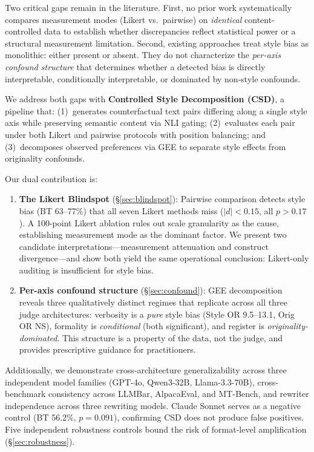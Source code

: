 \documentclass[11pt,twocolumn]{article}
\begin{document}
Two critical gaps remain in the literature. First, no prior work systematically compares measurement modes (Likert vs.\ pairwise) on \emph{identical} content-controlled data to establish whether discrepancies reflect statistical power or a structural measurement limitation. Second, existing approaches treat style bias as monolithic: either present or absent. They do not characterize the \emph{per-axis confound structure} that determines whether a detected bias is directly interpretable, conditionally interpretable, or dominated by non-style confounds.

We address both gaps with \textbf{Controlled Style Decomposition (CSD)}, a pipeline that: (1)~generates counterfactual text pairs differing along a single style axis while preserving semantic content via NLI gating; (2)~evaluates each pair under both Likert and pairwise protocols with position balancing; and (3)~decomposes observed preferences via GEE to separate style effects from originality confounds.

Our dual contribution is:

\begin{enumerate}
\item \textbf{The Likert Blindspot} (\S\ref{sec:blindspot}): Pairwise comparison detects style bias (BT 63--77\%) that all seven Likert methods miss ($|d| < 0.15$, all $p > 0.17$). A 100-point Likert ablation rules out scale granularity as the cause, establishing measurement mode as the dominant factor. We present two candidate interpretations---measurement attenuation and construct divergence---and show both yield the same operational conclusion: Likert-only auditing is insufficient for style bias.

\item \textbf{Per-axis confound structure} (\S\ref{sec:confound}): GEE decomposition reveals three qualitatively distinct regimes that replicate across all three judge architectures: verbosity is a \emph{pure} style bias (Style OR 9.5--13.1, Orig OR NS), formality is \emph{conditional} (both significant), and register is \emph{originality-dominated}. This structure is a property of the data, not the judge, and provides prescriptive guidance for practitioners.
\end{enumerate}

Additionally, we demonstrate cross-architecture generalizability across three independent model families (GPT-4o, Qwen3-32B, Llama-3.3-70B), cross-benchmark consistency across LLMBar, AlpacaEval, and MT-Bench, and rewriter independence across three rewriting models. Claude Sonnet serves as a negative control (BT 56.2\%, $p = 0.091$), confirming CSD does not produce false positives. Five independent robustness controls bound the risk of format-level amplification (\S\ref{sec:robustness}).
\end{document}
